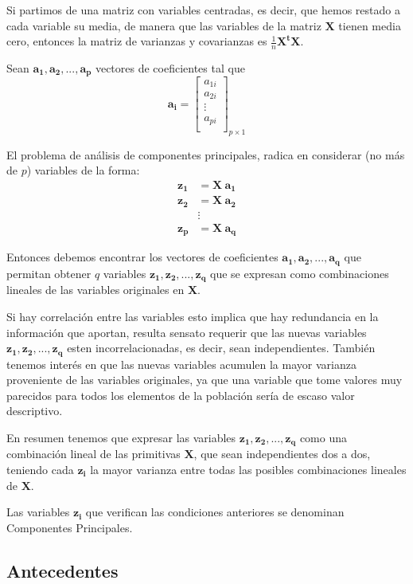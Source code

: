 \documentclass[12pt,letterpaper]{report} %
\begin{document}
Si partimos de una matriz con variables centradas, es decir, que hemos restado a cada variable su media, de manera que las variables de la matriz $\mathbf{X}$ tienen media cero, entonces la matriz de varianzas y covarianzas es $\frac{1}{n}\mathbf{X^t X}$.

Sean $\mathbf{a_1,a_2,...,a_p}$ vectores de coeficientes tal que 
$$
\mathbf{a_i}=
\begin{bmatrix}
a_{1i}  \\
a_{2i}  \\
\vdots  \\
a_{pi}  \\
\end{bmatrix}_{p\times 1}
$$

El problema de análisis de componentes principales, radica en considerar (no más de $p$) variables de la forma:
$$
\begin{array}{rl}
\mathbf{z_1} & = \mathbf{X\ a_1}\\
\mathbf{z_2} & = \mathbf{X\ a_2}\\
& \vdots\\
\mathbf{z_p} & = \mathbf{X\ a_q}
\end{array}
$$

Entonces debemos encontrar los vectores de coeficientes $\mathbf{a_1,a_2,...,a_q}$ que permitan obtener $q$ variables $\mathbf{z_1,z_2,...,z_q}$ que se expresan como combinaciones lineales de las variables originales en $\mathbf{X}$.

Si hay correlación entre las variables esto implica que hay redundancia en la información que aportan, resulta sensato requerir que las nuevas variables $\mathbf{z_1,z_2,...,z_q}$ esten incorrelacionadas, es decir, sean independientes. También tenemos interés en que las nuevas variables acumulen la mayor varianza proveniente de las variables originales, ya que una variable que tome valores muy parecidos para todos los elementos de la población sería de escaso valor descriptivo. 

En resumen tenemos que expresar las variables $\mathbf{z_1,z_2,...,z_q}$ como una combinación lineal de las primitivas $\mathbf{X}$, que sean independientes dos a dos, teniendo cada $\mathbf{z_i}$ la mayor varianza entre todas las posibles combinaciones lineales de $\mathbf{X}$.

Las variables $\mathbf{z_i}$ que verifican las condiciones anteriores se denominan Componentes Principales.

\subsection{Antecedentes}
\end{document}
